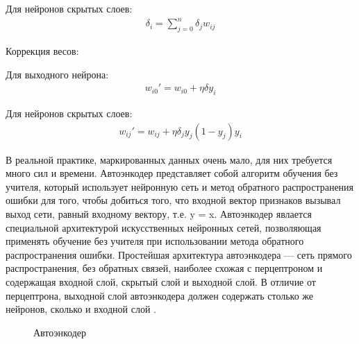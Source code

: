 \documentclass[12pt]{article}
\begin{document}
Для нейронов скрытых слоев:
  \begin{align}
	\delta_i=\sum_{j=0}^n \delta_j w_{ij}
  \end{align}

Коррекция весов:

Для выходного нейрона:
  \begin{align}
	w_{i0}'=w_{i0}+\eta\delta y_i
  \end{align}

Для нейронов скрытых слоев:
  \begin{align}
	w_{ij}'=w_{ij}+\eta\delta_j y_j(1-y_j)y_i
  \end{align}

В реальной практике, маркированных данных очень мало, для них требуется много сил и времени. Автоэнкодер представляет собой алгоритм обучения без учителя, который использует нейронную сеть и метод обратного распространения ошибки для того, чтобы добиться того, что входной вектор признаков вызывал выход сети, равный входному вектору, т.е. y = x. Автоэнкодер явлается специальной архитектурой искусственных нейронных сетей, позволяющая применять обучение без учителя при использовании метода обратного распространения ошибки. Простейшая архитектура автоэнкодера — сеть прямого распространения, без обратных связей, наиболее схожая с перцептроном и содержащая входной слой, скрытый слой и выходной слой. В отличие от перцептрона, выходной слой автоэнкодера должен содержать столько же нейронов, сколько и входной слой \cite{Stanford2}.

  \begin{figure}[H]
    \noindent{}
    \caption{Автоэнкодер}
    \label{figCurves}
  \end{figure}
\end{document}

